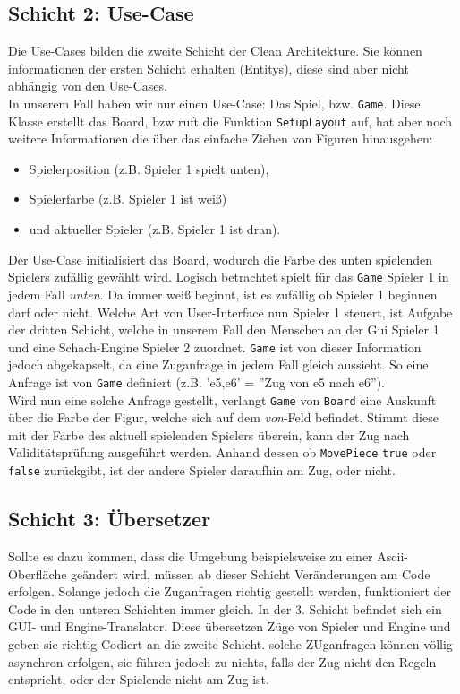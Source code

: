 \documentclass{article}
\begin{document}
\subsection{Schicht 2: Use-Case}
Die Use-Cases bilden die zweite Schicht der Clean Architekture. Sie können informationen der ersten Schicht erhalten (Entitys), diese sind aber nicht abhängig von den Use-Cases.\\
In unserem Fall haben wir nur einen Use-Case: Das Spiel, bzw. \texttt{Game}. Diese Klasse erstellt das Board, bzw ruft die Funktion \texttt{SetupLayout} auf, hat aber noch weitere Informationen die über das einfache Ziehen von Figuren hinausgehen:
\begin{center}
	\begin{itemize}
		\item Spielerposition (z.B. Spieler 1 spielt unten),
		\item Spielerfarbe (z.B. Spieler 1 ist weiß)
		\item und aktueller Spieler (z.B. Spieler 1 ist dran).
	\end{itemize}
\end{center}
Der Use-Case initialisiert das Board, wodurch die Farbe des unten spielenden Spielers zufällig gewählt wird. Logisch betrachtet spielt für das \texttt{Game} Spieler 1 in jedem Fall \textit{unten}. Da immer weiß beginnt, ist es zufällig ob Spieler 1 beginnen darf oder nicht. Welche Art von User-Interface nun Spieler 1 steuert, ist Aufgabe der dritten Schicht, welche in unserem Fall den Menschen an der Gui Spieler 1 und eine Schach-Engine Spieler 2 zuordnet. \texttt{Game} ist von dieser Information jedoch abgekapselt, da eine Zuganfrage in jedem Fall gleich aussieht.
So eine Anfrage ist von \texttt{Game} definiert (z.B. 'e5,e6' = ''Zug von e5 nach e6''). \\
Wird nun eine solche Anfrage gestellt, verlangt \texttt{Game} von \texttt{Board} eine Auskunft über die Farbe der Figur, welche sich auf dem \textit{von}-Feld befindet. Stimmt diese mit der Farbe des aktuell spielenden Spielers überein, kann der Zug nach Validitätsprüfung ausgeführt werden. Anhand dessen ob \texttt{MovePiece} \texttt{true} oder \texttt{false} zurückgibt, ist der andere Spieler daraufhin am Zug, oder nicht.
\subsection{Schicht 3: Übersetzer}
Sollte es dazu kommen, dass die Umgebung beispielsweise zu einer Ascii-Oberfläche geändert wird, müssen ab dieser Schicht Veränderungen am Code erfolgen. Solange jedoch die Zuganfragen richtig gestellt werden, funktioniert der Code in den unteren Schichten immer gleich. In der 3. Schicht befindet sich ein GUI- und Engine-Translator. Diese übersetzen Züge von Spieler und Engine und geben sie richtig Codiert an die zweite Schicht. solche ZUganfragen können völlig asynchron erfolgen, sie führen jedoch zu nichts, falls der Zug nicht den Regeln entspricht, oder der Spielende nicht am Zug ist.
\end{document}
